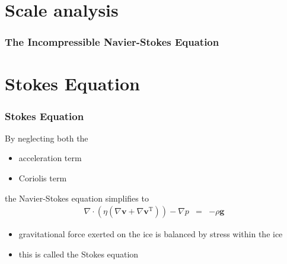 \documentclass[hide notes,intlimits]{beamer}
\begin{document}
 
\section{Scale analysis}

\begin{frame}
  \frametitle{The Incompressible Navier-Stokes Equation}
\end{frame}
 


\section{Stokes Equation}


\begin{frame}
  \frametitle{Stokes Equation}
  By neglecting both the
  \begin{itemize}
  \item acceleration term
  \item Coriolis term
  \end{itemize}
  the Navier-Stokes equation simplifies to
  \begin{eqnarray}
     \nabla \cdot \left(\eta\left(\nabla \mathbf{v} + \nabla \mathbf{v}^{\text{T}}\right)\right) - \nabla p & = & - \rho \mathbf{g}
  \end{eqnarray}
  \begin{itemize}
  \item gravitational force exerted on the ice is balanced by stress within the ice
  \item this is called the \alert{Stokes equation}
  \end{itemize}
\end{frame}
\end{document}

